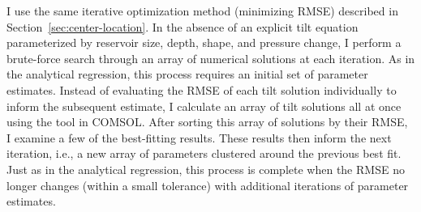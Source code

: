 I use the same iterative optimization method (minimizing \acs{RMSE}) described in Section~\ref{sec:center-location}. In the absence of an explicit tilt equation parameterized by reservoir size, depth, shape, and pressure change, I perform a brute-force search through an array of numerical solutions at each iteration. As in the analytical regression, this process requires an initial set of parameter estimates. Instead of evaluating the \acs{RMSE} of each tilt solution individually to inform the subsequent estimate, I calculate an array of tilt solutions all at once using the  tool in COMSOL. After sorting this array of solutions by their \acs{RMSE}, I examine a few of the best-fitting results. These results then inform the next iteration, i.e., a new array of parameters clustered around the previous best fit. Just as in the analytical regression, this process is complete when the \acs{RMSE} no longer changes (within a small tolerance) with additional iterations of parameter estimates.